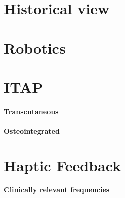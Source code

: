 \section{Historical view}
\section{Robotics}
\section{ITAP}
    \paragraph{Transcutaneous}
    \paragraph{Osteointegrated}
\section{Haptic Feedback}
    \paragraph{}
    \paragraph{Clinically relevant frequencies}